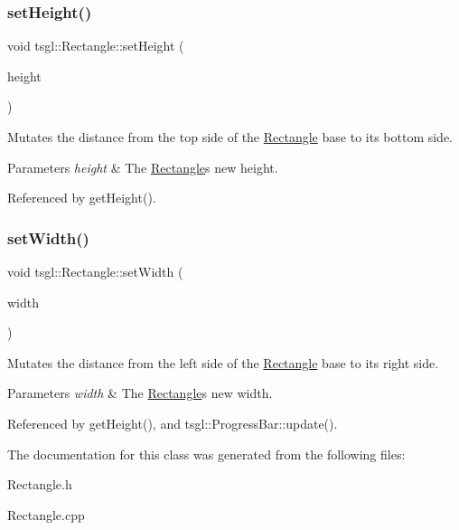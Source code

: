 \subsubsection{\texorpdfstring{set\+Height()}{setHeight()}}
{\footnotesize\ttfamily void tsgl\+::\+Rectangle\+::set\+Height (\begin{DoxyParamCaption}\item[{G\+Lfloat}]{height }\end{DoxyParamCaption})}



Mutates the distance from the top side of the \hyperlink{classtsgl_1_1_rectangle}{Rectangle} base to its bottom side. 


\begin{DoxyParams}{Parameters}
{\em height} & The \hyperlink{classtsgl_1_1_rectangle}{Rectangle}\textquotesingle{}s new height. \\
\hline
\end{DoxyParams}


Referenced by get\+Height().

\mbox{\label{classtsgl_1_1_rectangle_a85dd5be68f6f6101123b5659c8acff50}} 
\subsubsection{\texorpdfstring{set\+Width()}{setWidth()}}
{\footnotesize\ttfamily void tsgl\+::\+Rectangle\+::set\+Width (\begin{DoxyParamCaption}\item[{G\+Lfloat}]{width }\end{DoxyParamCaption})}



Mutates the distance from the left side of the \hyperlink{classtsgl_1_1_rectangle}{Rectangle} base to its right side. 


\begin{DoxyParams}{Parameters}
{\em width} & The \hyperlink{classtsgl_1_1_rectangle}{Rectangle}\textquotesingle{}s new width. \\
\hline
\end{DoxyParams}


Referenced by get\+Height(), and tsgl\+::\+Progress\+Bar\+::update().



The documentation for this class was generated from the following files\+:\begin{DoxyCompactItemize}
\item 
Rectangle.\+h\item 
Rectangle.\+cpp\end{DoxyCompactItemize}
